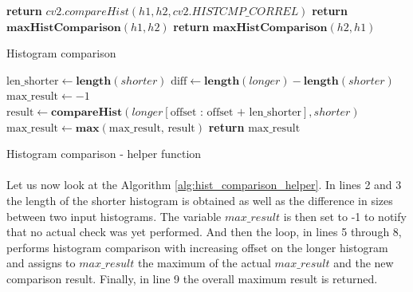 \begin{algorithm}
	\begin{spacing}{1.5}
	\begin{algorithmic}[1]
				\State \textbf{return} $cv2.compareHist(h1, h2, cv2.HISTCMP\_CORREL)$
				\State \textbf{return} $\textbf{maxHistComparison}(h1, h2)$
			\Else
				\State \textbf{return} $\textbf{maxHistComparison}(h2, h1)$
			\EndIf
		\EndFunction
	\end{algorithmic}
	\end{spacing}
	\caption{Histogram comparison}
	\label{alg:hist_comparison}
\end{algorithm}

\begin{algorithm}
	\begin{spacing}{1.5}
	\begin{algorithmic}[1]
			\State $\text{len\_shorter} \gets \textbf{length}(shorter)$
			\State $\text{diff} \gets \textbf{length}(longer) - \textbf{length}(shorter)$
			\State $\text{max\_result} \gets -1$
				\State $\text{result} \gets \textbf{compareHist}(longer[\text{offset : offset + len\_shorter}], shorter)$
				\State $\text{max\_result} \gets \textbf{max}(\text{max\_result, result})$
			\EndFor
			\State \textbf{return} $\text{max\_result}$
		\EndFunction
	\end{algorithmic}
	\end{spacing}
	\caption{Histogram comparison - helper function}
	\label{alg:hist_comparison_helper}
\end{algorithm}

\paragraph{}
Let us now look at the Algorithm \ref{alg:hist_comparison_helper}. In lines 2 and 3 the length of the shorter histogram is obtained as well as the difference in sizes between two input histograms. The variable $max\_result$ is then set to -1 to notify that no actual check was yet performed. And then the loop, in lines 5 through 8, performs histogram comparison with increasing offset on the longer histogram and assigns to $max\_result$ the maximum of the actual $max\_result$ and the new comparison result. Finally, in line 9 the overall maximum result is returned.

